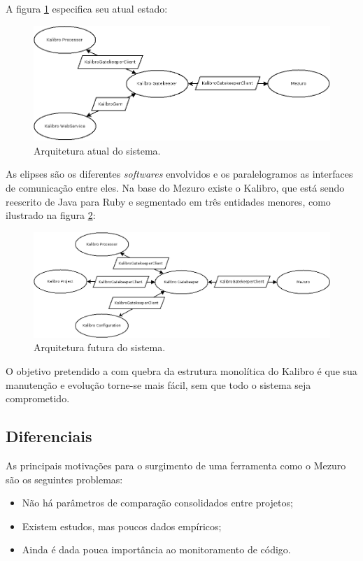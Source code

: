 \documentclass{llncs}
\begin{document}
  A figura \ref{fig:architecture-1} especifica seu atual estado:
  \begin{figure}[H]
    \centering
    \includegraphics[width=\textwidth]{images/mezuro-architecture-actual.png}
    \caption{Arquitetura atual do sistema.}
    \label{fig:architecture-1}
  \end{figure}
  As elipses são os diferentes \textit{softwares} envolvidos e os paralelogramos as interfaces de comunicação entre eles. Na base do Mezuro existe o Kalibro, que está sendo reescrito
  de Java para Ruby e segmentado em três entidades menores, como ilustrado na figura \ref{fig:architecture-2}:
  \begin{figure}[H]
    \centering
      \includegraphics[width=\textwidth]{images/mezuro-architecture-predicted.png}
    \caption{Arquitetura futura do sistema.}
    \label{fig:architecture-2}
  \end{figure}
  O objetivo pretendido a com quebra da estrutura monolítica do Kalibro é que sua manutenção e evolução torne-se mais fácil, sem que todo o sistema seja comprometido.

  \subsection{Diferenciais} \label{subsec:motivacao}
  As principais motivações para o surgimento de uma ferramenta como o Mezuro são os seguintes problemas:
  \begin{itemize}
      \item Não há parâmetros de comparação consolidados entre projetos;
      \item Existem estudos, mas poucos dados empíricos;
      \item Ainda é dada pouca importância ao monitoramento de código.
  \end{itemize}
\end{document}
